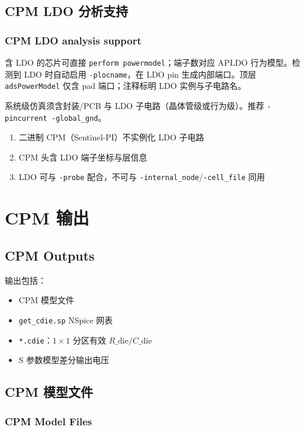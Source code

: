 \subsection{CPM LDO 分析支持}
\subsubsection*{CPM LDO analysis support}

含 LDO 的芯片可直接 \texttt{perform powermodel}；端子数对应 APLDO 行为模型。检测到 LDO 时自动启用 \texttt{-plocname}，在 LDO pin 生成内部端口。顶层 \texttt{adsPowerModel} 仅含 pad 端口；注释标明 LDO 实例与子电路名。

系统级仿真须含封装/PCB 与 LDO 子电路（晶体管级或行为级）。推荐 \texttt{-pincurrent -global\_gnd}。

\begin{noteBox}
\begin{enumerate}
  \item 二进制 CPM（Sentinel-PI）不实例化 LDO 子电路
  \item CPM 头含 LDO 端子坐标与层信息
  \item LDO 可与 \texttt{-probe} 配合，不可与 \texttt{-internal\_node}/\texttt{-cell\_file} 同用
\end{enumerate}
\end{noteBox}

\section{CPM 输出}
\subsection*{CPM Outputs}

输出包括：
\begin{itemize}
  \item CPM 模型文件
  \item \texttt{get\_cdie.sp} NSpice 网表
  \item \texttt{*.cdie}：$1\times1$ 分区有效 $R\_{\mathrm{die}}/C\_{\mathrm{die}}$
  \item S 参数模型差分输出电压
\end{itemize}

\subsection{CPM 模型文件}
\subsubsection*{CPM Model Files}

